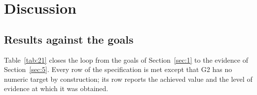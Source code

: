 \section{Discussion}\label{sec:6}

\subsection{Results against the goals}\label{sec:6.1}

Table~\ref{tab:21} closes the loop from the goals of Section~\ref{sec:1} to the evidence of Section~\ref{sec:5}. Every row of the specification is met except that G2 has no numeric target by construction; its row reports the achieved value and the level of evidence at which it was obtained.

